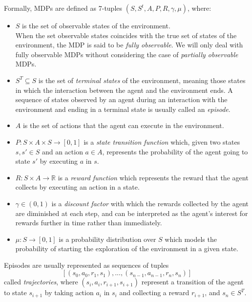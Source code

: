 Formally, MDPs are defined as 7-tuples $(S, S^{t}, A, P, R, \gamma, \mu)$, 
where:
\begin{itemize}
    \item $S$ is the set of observable states of the environment. \\
    When the set observable states coincides with the true set of states of the 
    environment, the MDP is said to be \textit{fully observable}. We will only deal 
    with fully observable MDPs without considering the case of \textit{partially 
    observable} MDPs.

    \item $S^{T} \subseteq S$ is the set of \textit{terminal states} of the 
    environment, meaning those states in which the interaction between the agent and 
    the environment ends. A sequence of states observed by an agent during an 
    interaction with the environment and ending in a terminal state is usually 
    called an \textit{episode}.
 
    \item $A$ is the set of actions that the agent can execute in the environment.
 
    \item $P: S \times A \times S \rightarrow [0,1]$ is a \textit{state transition 
    function} which, given two states $s, s' \in S$ and an action $a \in A$, 
    represents the probability of the agent going to state $s'$ by executing $a$ in 
    $s$.
 
    \item $R: S \times A \rightarrow \mathbb{R}$ is a \textit{reward function} 
    which represents the reward that the agent collects by executing an action in 
    a state. 
    
    \item $\gamma \in (0,1)$ is a \textit{discount factor} with which the rewards 
    collected by the agent are diminished at each step, and can be interpreted as 
    the agent's interest for rewards further in time rather than immediately.
    
    \item $\mu: S \rightarrow [0, 1]$ is a probability distribution over $S$ which 
    models the probability of starting the exploration of the environment in a 
    given state.
\end{itemize}

Episodes are usually represented as sequences of tuples 
\[
    [(s_0, a_0, r_1, s_1), ..., (s_{n-1}, a_{n-1}, r_n, s_n)]
\]
called \textit{trajectories}, where $(s_i, a_i, r_{i+1}, s_{i+1})$ represent a
transition of the agent to state $s_{i+1}$ by taking action $a_i$ in $s_i$ and 
collecting a reward $r_{i+1}$, and $s_n \in S^T$.

